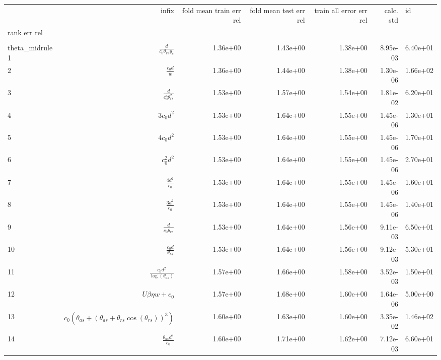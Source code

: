 \begin{tabularx}{\textwidth}{lRRRRRl}
\toprule
  &  infix  &  fold mean train err rel  &  fold mean test err rel  &  train all error err rel  &  calc. std  &  id  \\ 
rank err rel  &    &    &    &    &    &    \\ 
\\theta_{mid}rule
1  &  $ \displaystyle\frac{d}{c_{0} \theta_{rs} y_c} $  &  1.36e+00  &  1.43e+00  &  1.38e+00  &  8.95e-03  &  6.40e+01  \\ 
2  &  $ \displaystyle\frac{c_{0} d}{w} $  &  1.36e+00  &  1.44e+00  &  1.38e+00  &  1.30e-06  &  1.66e+02  \\ 
3  &  $ \displaystyle\frac{d}{c_{0}^{6} \theta_{rs}^{2}} $  &  1.53e+00  &  1.57e+00  &  1.54e+00  &  1.81e-02  &  6.20e+01  \\ 
4  &  $ 3 c_{0} d^{2} $  &  1.53e+00  &  1.64e+00  &  1.55e+00  &  1.45e-06  &  1.30e+01  \\ 
5  &  $ 4 c_{0} d^{2} $  &  1.53e+00  &  1.64e+00  &  1.55e+00  &  1.45e-06  &  1.70e+01  \\ 
6  &  $ c_{0}^{2} d^{2} $  &  1.53e+00  &  1.64e+00  &  1.55e+00  &  1.45e-06  &  2.70e+01  \\ 
7  &  $ \displaystyle\frac{4 d^{2}}{c_{0}} $  &  1.53e+00  &  1.64e+00  &  1.55e+00  &  1.45e-06  &  1.60e+01  \\ 
8  &  $ \displaystyle\frac{3 d^{2}}{c_{0}} $  &  1.53e+00  &  1.64e+00  &  1.55e+00  &  1.45e-06  &  1.40e+01  \\ 
9  &  $ \displaystyle\frac{d}{c_{0} \theta_{rs}} $  &  1.53e+00  &  1.64e+00  &  1.56e+00  &  9.11e-03  &  6.50e+01  \\ 
10  &  $ \displaystyle\frac{c_{0} d}{\theta_{rs}} $  &  1.53e+00  &  1.64e+00  &  1.56e+00  &  9.12e-03  &  5.30e+01  \\ 
11  &  $ \displaystyle\frac{c_{0} d^{2}}{\log{\left(\theta_{as} \right)}} $  &  1.57e+00  &  1.66e+00  &  1.58e+00  &  3.52e-03  &  1.50e+01  \\ 
12  &  $ U \beta \eta w + c_{0} $  &  1.57e+00  &  1.68e+00  &  1.60e+00  &  1.64e-06  &  5.00e+00  \\ 
13  &  $ c_{0} \left(\theta_{as} + \left(\theta_{as} + \theta_{rs} \cos{\left(\theta_{rs} \right)}\right)^{3}\right) $  &  1.60e+00  &  1.63e+00  &  1.60e+00  &  3.35e-02  &  1.46e+02  \\ 
14  &  $ \displaystyle\frac{\theta_{as} d^{2}}{c_{0}} $  &  1.60e+00  &  1.71e+00  &  1.62e+00  &  7.12e-03  &  6.60e+01  \\ 

\end{tabularx}
